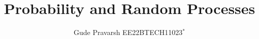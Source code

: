 \documentclass[article,12pt]{IEEEtran}
\begin{document}
\title{
Probability and Random Processes
}
\author{ Gude Pravarsh EE22BTECH11023$^{*}$%
}
\date{}
\maketitle
\vspace{3pt}

\providecommand{\pr}[1]{\ensuremath{\Pr\left(#1\right)}}
\providecommand{\prt}[2]{\ensuremath{p_{#1}^{\left(#2\right)} }}        %
\providecommand{\qfunc}[1]{\ensuremath{Q\left(#1\right)}}
\providecommand{\sbrak}[1]{\ensuremath{{}\left[#1\right]}}
\providecommand{\lsbrak}[1]{\ensuremath{{}\left[#1\right.}}
\providecommand{\rsbrak}[1]{\ensuremath{{}\left.#1\right]}}
\providecommand{\brak}[1]{\ensuremath{\left(#1\right)}}
\providecommand{\lbrak}[1]{\ensuremath{\left(#1\right.}}
\providecommand{\rbrak}[1]{\ensuremath{\left.#1\right)}}
\providecommand{\cbrak}[1]{\ensuremath{\left\{#1\right\}}}
\providecommand{\lcbrak}[1]{\ensuremath{\left\{#1\right.}}
\providecommand{\rcbrak}[1]{\ensuremath{\left.#1\right\}}}
\newcommand{\sgn}{\mathop{\mathrm{sgn}}}
\providecommand{\abs}[1]{\left\vert#1\right\vert}
\providecommand{\res}[1]{\Res\displaylimits_{#1}} 
\providecommand{\norm}[1]{\left\lVert#1\right\rVert}
\providecommand{\mtx}[1]{\mathbf{#1}}
\providecommand{\mean}[1]{E\left[ #1 \right]}
\providecommand{\cond}[2]{#1\middle|#2}
\providecommand{\fourier}{\overset{\mathcal{F}}{ \rightleftharpoons}}
\newenvironment{amatrix}[1]{%
  \left(\begin{array}{@{}*{#1}{c}|c@{}}
}{%
  \end{array}\right)
}
\newcommand{\solution}{\noindent \textbf{Solution: }}
\newcommand{\cosec}{\,\text{cosec}\,}
\providecommand{\dec}[2]{\ensuremath{\overset{#1}{\underset{#2}{\gtrless}}}}
\newcommand{\myvec}[1]{\ensuremath{\begin{pmatrix}#1\end{pmatrix}}}
\newcommand{\mydet}[1]{\enuremath{\begin{vmatrix}#1\end{vmatrix}}}
\newcommand{\myaugvec}[2]{\ensuremath{\begin{amatrix}{#1}#2\end{amatrix}}}
\providecommand{\rank}{\text{rank}}
\end{document}
